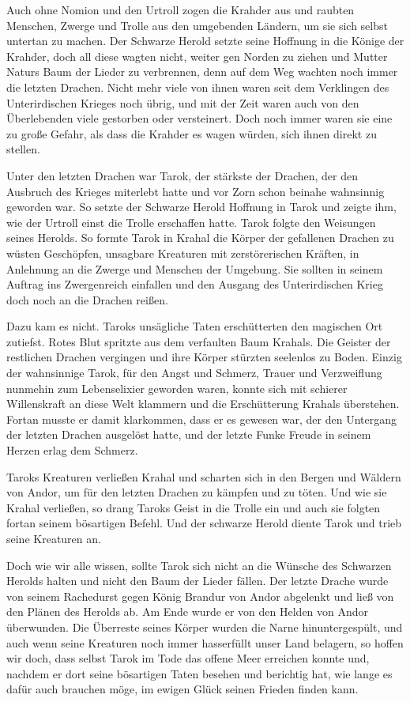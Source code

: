 Auch ohne Nomion und den Urtroll zogen die Krahder aus und raubten Menschen, Zwerge und Trolle aus den umgebenden Ländern, um sie sich selbst untertan zu machen. Der Schwarze Herold setzte seine Hoffnung in die Könige der Krahder, doch all diese wagten nicht, weiter gen Norden zu ziehen und Mutter Naturs Baum der Lieder zu verbrennen, denn auf dem Weg wachten noch immer die letzten Drachen. Nicht mehr viele von ihnen waren seit dem Verklingen des Unterirdischen Krieges noch übrig, und mit der Zeit waren auch von den Überlebenden viele gestorben oder versteinert. Doch noch immer waren sie eine zu große Gefahr, als dass die Krahder es wagen würden, sich ihnen direkt zu stellen.

Unter den letzten Drachen war Tarok, der stärkste der Drachen, der den Ausbruch des Krieges miterlebt hatte und vor Zorn schon beinahe wahnsinnig geworden war. So setzte der Schwarze Herold Hoffnung in Tarok und zeigte ihm, wie der Urtroll einst die Trolle erschaffen hatte. Tarok folgte den Weisungen seines Herolds. So formte Tarok in Krahal die Körper der gefallenen Drachen zu wüsten Geschöpfen, unsagbare Kreaturen mit zerstörerischen Kräften, in Anlehnung an die Zwerge und Menschen der Umgebung. Sie sollten in seinem Auftrag ins Zwergenreich einfallen und den Ausgang des Unterirdischen Krieg doch noch an die Drachen reißen.

Dazu kam es nicht. Taroks unsägliche Taten erschütterten den magischen Ort zutiefst. Rotes Blut spritzte aus dem verfaulten Baum Krahals. Die Geister der restlichen Drachen vergingen und ihre Körper stürzten seelenlos zu Boden. Einzig der wahnsinnige Tarok, für den Angst und Schmerz, Trauer und Verzweiflung nunmehin zum Lebenselixier geworden waren, konnte sich mit schierer Willenskraft an diese Welt klammern und die Erschütterung Krahals überstehen. Fortan musste er damit klarkommen, dass er es gewesen war, der den Untergang der letzten Drachen ausgelöst hatte, und der letzte Funke Freude in seinem Herzen erlag dem Schmerz.

Taroks Kreaturen verließen Krahal und scharten sich in den Bergen und Wäldern von Andor, um für den letzten Drachen zu kämpfen und zu töten. Und wie sie Krahal verließen, so drang Taroks Geist in die Trolle ein und auch sie folgten fortan seinem bösartigen Befehl. Und der schwarze Herold diente Tarok und trieb seine Kreaturen an.

Doch wie wir alle wissen, sollte Tarok sich nicht an die Wünsche des Schwarzen Herolds halten und nicht den Baum der Lieder fällen. Der letzte Drache wurde von seinem Rachedurst gegen König Brandur von Andor abgelenkt und ließ von den Plänen des Herolds ab. Am Ende wurde er von den Helden von Andor überwunden. Die Überreste seines Körper wurden die Narne hinuntergespült, und auch wenn seine Kreaturen noch immer hasserfüllt unser Land belagern, so hoffen wir doch, dass selbst Tarok im Tode das offene Meer erreichen konnte und, nachdem er dort seine bösartigen Taten besehen und berichtig hat, wie lange es dafür auch brauchen möge, im ewigen Glück seinen Frieden finden kann.


